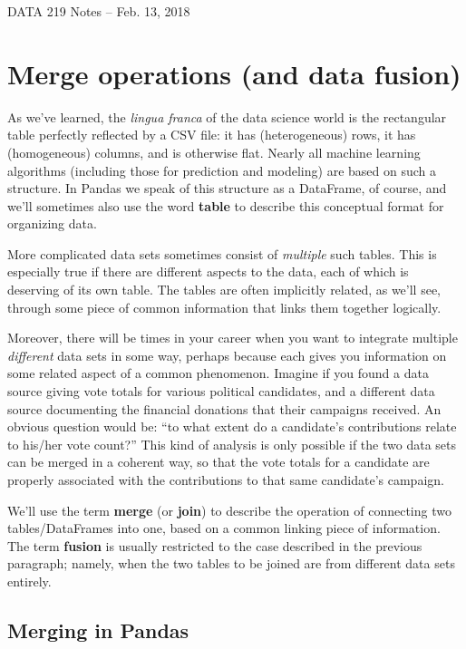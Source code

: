 \documentclass[12pt]{article}
\begin{document}
\begin{center}
\begin{Large}
DATA 219 Notes -- Feb. 13, 2018
\end{Large}
\end{center}

\section{Merge operations (and data fusion)}

As we've learned, the \textit{lingua franca} of the data science world is the
rectangular table perfectly reflected by a CSV file: it has (heterogeneous)
rows, it has (homogeneous) columns, and is otherwise flat. Nearly all machine
learning algorithms (including those for prediction and modeling) are based on
such a structure. In Pandas we speak of this structure as a DataFrame, of
course, and we'll sometimes also use the word \textbf{table} to describe this
conceptual format for organizing data.

More complicated data sets sometimes consist of \textit{multiple} such tables.
This is especially true if there are different aspects to the data, each of
which is deserving of its own table. The tables are often implicitly related,
as we'll see, through some piece of common information that links them
together logically.

Moreover, there will be times in your career when you want to integrate
multiple \textit{different} data sets in some way, perhaps because each gives
you information on some related aspect of a common phenomenon. Imagine if you
found a data source giving vote totals for various political candidates, and a
different data source documenting the financial donations that their campaigns
received. An obvious question would be: ``to what extent do a candidate's
contributions relate to his/her vote count?'' This kind of analysis is only
possible if the two data sets can be merged in a coherent way, so that the
vote totals for a candidate are properly associated with the contributions to
that same candidate's campaign.

We'll use the term \textbf{merge} (or \textbf{join}) to describe the operation
of connecting two tables/DataFrames into one, based on a common linking piece
of information. The term \textbf{fusion} is usually restricted to the case
described in the previous paragraph; namely, when the two tables to be joined
are from different data sets entirely.

\subsection{Merging in Pandas}
\end{document}
